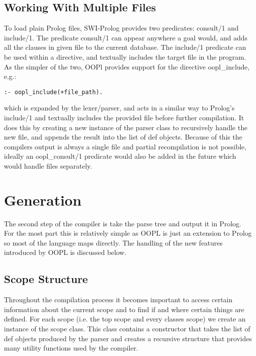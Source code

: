 \documentclass[12pt,a4paper,twoside,openright]{report}
\begin{document}
\subsection{Working With Multiple Files}

To load plain Prolog files, SWI-Prolog provides two predicates: consult/1 and include/1. The predicate consult/1 can appear anywhere a goal would, and adds all the clauses in given file to the current database. The include/1 predicate can be used within a directive, and textually includes the target file in the program. As the simpler of the two, OOPl provides support for the directive oopl_include, e.g.:

\begin{lstlisting}
:- oopl_include(+file_path).
\end{lstlisting}

which is expanded by the lexer/parser, and acts in a similar way to Prolog's include/1 and textually includes the provided file before further compilation. It does this by creating a new instance of the parser class to recursively handle the new file, and appends the result into the list of def objects. Because of this the compilers output is always a single file and partial recompilation is not possible, ideally an oopl_consult/1 predicate would also be added in the future which would handle files separately.

\section{Generation}

The second step of the compiler is take the parse tree and output it in Prolog. For the most part this is relatively simple as OOPL is just an extension to Prolog so most of the language maps directly. The handling of the new features introduced by OOPL is discussed below.

\subsection{Scope Structure}

Throughout the compilation process it becomes important to access certain information about the current scope and to find if and where certain things are defined. For each scope (i.e. the top scope and every classes scope) we create an instance of the scope class. This class contains a constructor that takes the list of def objects produced by the parser and creates a recursive structure that provides many utility functions used by the compiler. 
\end{document}
